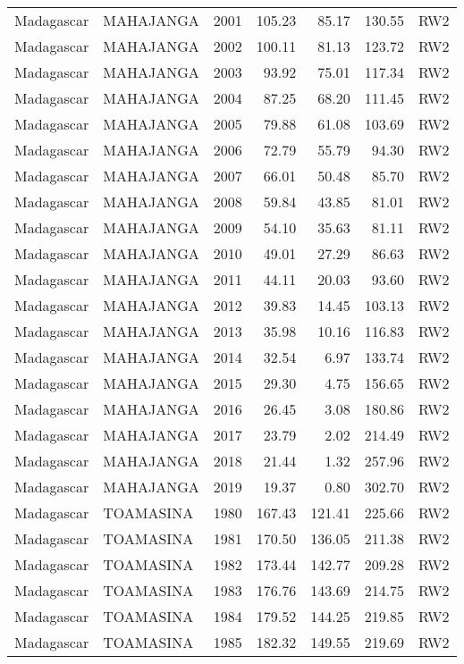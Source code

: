 \begin{longtable}{lllrrrl}
  Madagascar & MAHAJANGA & 2001 & 105.23 & 85.17 & 130.55 & RW2 \\ 
  Madagascar & MAHAJANGA & 2002 & 100.11 & 81.13 & 123.72 & RW2 \\ 
  Madagascar & MAHAJANGA & 2003 & 93.92 & 75.01 & 117.34 & RW2 \\ 
  Madagascar & MAHAJANGA & 2004 & 87.25 & 68.20 & 111.45 & RW2 \\ 
  Madagascar & MAHAJANGA & 2005 & 79.88 & 61.08 & 103.69 & RW2 \\ 
  Madagascar & MAHAJANGA & 2006 & 72.79 & 55.79 & 94.30 & RW2 \\ 
  Madagascar & MAHAJANGA & 2007 & 66.01 & 50.48 & 85.70 & RW2 \\ 
  Madagascar & MAHAJANGA & 2008 & 59.84 & 43.85 & 81.01 & RW2 \\ 
  Madagascar & MAHAJANGA & 2009 & 54.10 & 35.63 & 81.11 & RW2 \\ 
  Madagascar & MAHAJANGA & 2010 & 49.01 & 27.29 & 86.63 & RW2 \\ 
  Madagascar & MAHAJANGA & 2011 & 44.11 & 20.03 & 93.60 & RW2 \\ 
  Madagascar & MAHAJANGA & 2012 & 39.83 & 14.45 & 103.13 & RW2 \\ 
  Madagascar & MAHAJANGA & 2013 & 35.98 & 10.16 & 116.83 & RW2 \\ 
  Madagascar & MAHAJANGA & 2014 & 32.54 & 6.97 & 133.74 & RW2 \\ 
  Madagascar & MAHAJANGA & 2015 & 29.30 & 4.75 & 156.65 & RW2 \\ 
  Madagascar & MAHAJANGA & 2016 & 26.45 & 3.08 & 180.86 & RW2 \\ 
  Madagascar & MAHAJANGA & 2017 & 23.79 & 2.02 & 214.49 & RW2 \\ 
  Madagascar & MAHAJANGA & 2018 & 21.44 & 1.32 & 257.96 & RW2 \\ 
  Madagascar & MAHAJANGA & 2019 & 19.37 & 0.80 & 302.70 & RW2 \\ 
  Madagascar & TOAMASINA & 1980 & 167.43 & 121.41 & 225.66 & RW2 \\ 
  Madagascar & TOAMASINA & 1981 & 170.50 & 136.05 & 211.38 & RW2 \\ 
  Madagascar & TOAMASINA & 1982 & 173.44 & 142.77 & 209.28 & RW2 \\ 
  Madagascar & TOAMASINA & 1983 & 176.76 & 143.69 & 214.75 & RW2 \\ 
  Madagascar & TOAMASINA & 1984 & 179.52 & 144.25 & 219.85 & RW2 \\ 
  Madagascar & TOAMASINA & 1985 & 182.32 & 149.55 & 219.69 & RW2 \\ 

\end{longtable}
